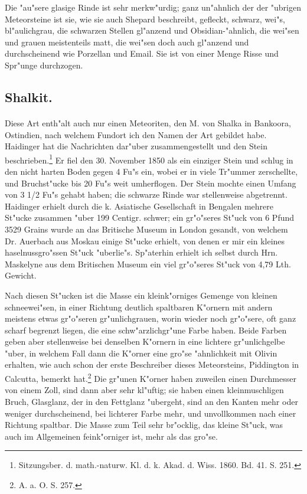\documentclass[a4paper, 11pt, oneside, german]{article}
\begin{document}
Die "au"sere glasige Rinde ist sehr merkw"urdig; ganz un"ahnlich der der "ubrigen Meteorsteine ist sie, wie sie auch Shepard beschreibt, gefleckt, schwarz, wei"s, bl"aulichgrau, die schwarzen Stellen gl"anzend und Obsidian-"ahnlich, die wei"sen und grauen meistenteils matt, die wei"sen doch auch gl"anzend und durchscheinend wie Porzellan und Email. Sie ist von einer Menge Risse und Spr"unge durchzogen.
\subsection{Shalkit.}
\paragraph{}
Diese Art enth"alt auch nur einen Meteoriten, den M. von Shalka in Bankoora, Ostindien, nach welchem Fundort ich den Namen der Art gebildet habe. Haidinger hat die Nachrichten dar"uber zusammengestellt und den Stein beschrieben.\footnote{Sitzungsber. d. math.-naturw. Kl. d. k. Akad. d. Wiss. 1860. Bd. 41. S. 251.} Er fiel den 30. November 1850 als ein einziger Stein und schlug in den nicht harten Boden gegen 4 Fu"s ein, wobei er in viele Tr"ummer zerschellte, und Bruchst"ucke bis 20 Fu"s weit umherflogen. Der Stein mochte einen Umfang von 3 1/2 Fu"s gehabt haben; die schwarze Rinde war stellenweise abgetrennt. Haidinger erhielt durch die k. Asiatische Gesellschaft in Bengalen mehrere St"ucke zusammen "uber 199 Centigr. schwer; ein gr"o"seres St"uck von 6 Pfund 3529 Grains wurde an das Britische Museum in London gesandt, von welchem Dr. Auerbach aus Moskau einige St"ucke erhielt, von denen er mir ein kleines haselnussgro"ssen St"uck "uberlie"s. Sp"aterhin erhielt ich selbst durch Hrn. Maskelyne aus dem Britischen Museum ein viel gr"o"seres St"uck von 4,79 Lth. Gewicht.

Nach diesen St"ucken ist die Masse ein kleink"orniges Gemenge von kleinen schneewei"sen, in einer Richtung deutlich spaltbaren K"ornern mit andern meistens etwas gr"o"seren gr"unlichgrauen, worin wieder noch gr"o"sere, oft ganz scharf begrenzt liegen, die eine schw"arzlichgr"une Farbe haben. Beide Farben geben aber stellenweise bei denselben K"ornern in eine lichtere gr"unlichgelbe "uber, in welchem Fall dann die K"orner eine gro"se "ahnlichkeit mit Olivin erhalten, wie auch schon der erste Beschreiber dieses Meteorsteins, Piddington in Calcutta, bemerkt hat.\footnote{A. a. O. S. 257.} Die gr"unen K"orner haben zuweilen einen Durchmesser von einem Zoll, sind dann aber sehr kl"uftig; sie haben einen kleinmuschligen Bruch, Glasglanz, der in den Fettglanz "ubergeht, sind an den Kanten mehr oder weniger durchscheinend, bei lichterer Farbe mehr, und unvollkommen nach einer Richtung spaltbar. Die Masse zum Teil sehr br"ocklig, das kleine St"uck, was auch im Allgemeinen feink"orniger ist, mehr als das gro"se.
\end{document}
